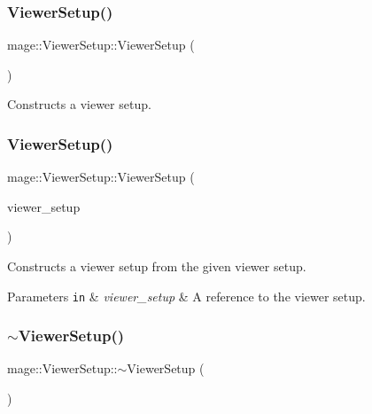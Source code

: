 \subsubsection{\texorpdfstring{Viewer\+Setup()}{ViewerSetup()}\hspace{0.1cm}{\footnotesize\ttfamily [1/2]}}
{\footnotesize\ttfamily mage\+::\+Viewer\+Setup\+::\+Viewer\+Setup (\begin{DoxyParamCaption}{ }\end{DoxyParamCaption})}

Constructs a viewer setup. \hypertarget{structmage_1_1_viewer_setup_a4358e8d3e83b61720bec3e921c438fc9}{}\label{structmage_1_1_viewer_setup_a4358e8d3e83b61720bec3e921c438fc9} 
\subsubsection{\texorpdfstring{Viewer\+Setup()}{ViewerSetup()}\hspace{0.1cm}{\footnotesize\ttfamily [2/2]}}
{\footnotesize\ttfamily mage\+::\+Viewer\+Setup\+::\+Viewer\+Setup (\begin{DoxyParamCaption}\item[{const \hyperlink{structmage_1_1_viewer_setup}{Viewer\+Setup} \&}]{viewer\+\_\+setup }\end{DoxyParamCaption})}

Constructs a viewer setup from the given viewer setup.


\begin{DoxyParams}[1]{Parameters}
\mbox{\tt in}  & {\em viewer\+\_\+setup} & A reference to the viewer setup. \\
\hline
\end{DoxyParams}
\hypertarget{structmage_1_1_viewer_setup_abc25ec011dfcee9c0c40b9ae89e3e1b1}{}\label{structmage_1_1_viewer_setup_abc25ec011dfcee9c0c40b9ae89e3e1b1} 
\subsubsection{\texorpdfstring{$\sim$\+Viewer\+Setup()}{~ViewerSetup()}}
{\footnotesize\ttfamily mage\+::\+Viewer\+Setup\+::$\sim$\+Viewer\+Setup (\begin{DoxyParamCaption}{ }\end{DoxyParamCaption})}

